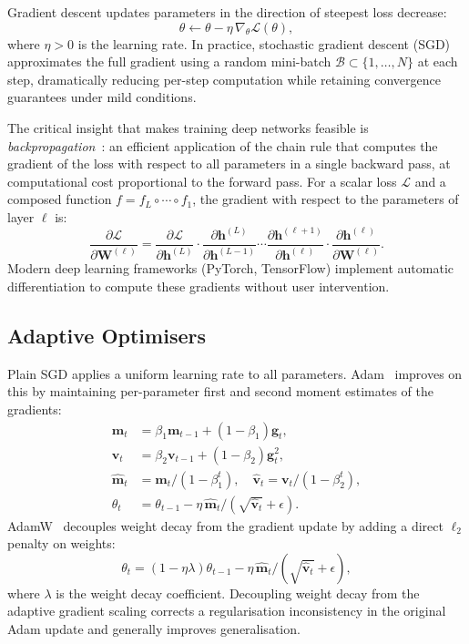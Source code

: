 Gradient descent updates parameters in the direction of steepest loss decrease:
\begin{equation}
  \theta \leftarrow \theta - \eta \,\nabla_\theta \mathcal{L}(\theta),
\end{equation}
where $\eta > 0$ is the learning rate.
In practice, stochastic gradient descent (SGD) approximates the full gradient
using a random mini-batch $\mathcal{B} \subset \{1,\ldots,N\}$ at each step,
dramatically reducing per-step computation while retaining convergence
guarantees under mild conditions.

The critical insight that makes training deep networks feasible is
\emph{backpropagation}~\cite{lecun1989backpropagation}: an efficient
application of the chain rule that computes the gradient of the loss with
respect to all parameters in a single backward pass, at computational cost
proportional to the forward pass.
For a scalar loss $\mathcal{L}$ and a composed function $f = f_L \circ \cdots \circ f_1$,
the gradient with respect to the parameters of layer $\ell$ is:
\begin{equation}
  \frac{\partial \mathcal{L}}{\partial \mathbf{W}^{(\ell)}} =
    \frac{\partial \mathcal{L}}{\partial \mathbf{h}^{(L)}}
    \cdot \frac{\partial \mathbf{h}^{(L)}}{\partial \mathbf{h}^{(L-1)}}
    \cdots \frac{\partial \mathbf{h}^{(\ell+1)}}{\partial \mathbf{h}^{(\ell)}}
    \cdot \frac{\partial \mathbf{h}^{(\ell)}}{\partial \mathbf{W}^{(\ell)}}.
\end{equation}
Modern deep learning frameworks (PyTorch, TensorFlow) implement automatic
differentiation to compute these gradients without user intervention.

\subsection{Adaptive Optimisers}

Plain SGD applies a uniform learning rate to all parameters.
Adam~\cite{kingma2015adam} improves on this by maintaining
per-parameter first and second moment estimates of the gradients:
\begin{align}
  \mathbf{m}_t &= \beta_1 \mathbf{m}_{t-1} + (1-\beta_1)\mathbf{g}_t, \\
  \mathbf{v}_t &= \beta_2 \mathbf{v}_{t-1} + (1-\beta_2)\mathbf{g}_t^2, \\
  \hat{\mathbf{m}}_t &= \mathbf{m}_t / (1 - \beta_1^t), \quad
  \hat{\mathbf{v}}_t = \mathbf{v}_t / (1 - \beta_2^t), \\
  \theta_t &= \theta_{t-1} - \eta\, \hat{\mathbf{m}}_t / (\sqrt{\hat{\mathbf{v}}_t} + \epsilon).
\end{align}
AdamW~\cite{loshchilov2017decoupled} decouples weight decay from the gradient
update by adding a direct $\ell_2$ penalty on weights:
\begin{equation}
  \theta_t = (1 - \eta\lambda)\theta_{t-1}
    - \eta\, \hat{\mathbf{m}}_t / (\sqrt{\hat{\mathbf{v}}_t} + \epsilon),
\end{equation}
where $\lambda$ is the weight decay coefficient.
Decoupling weight decay from the adaptive gradient scaling corrects a
regularisation inconsistency in the original Adam update and generally
improves generalisation.

